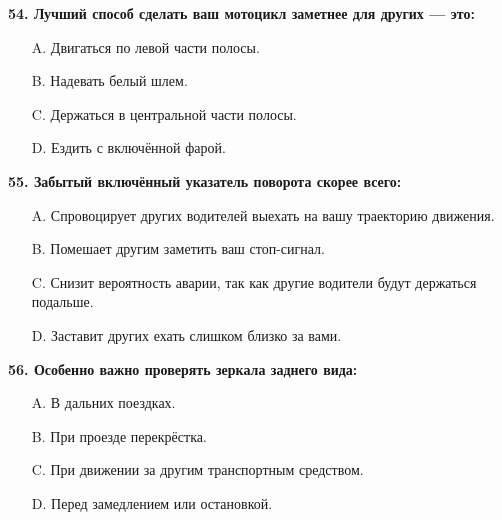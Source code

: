 \begin{minipage}{\linewidth}
\vspace{1em}\noindent\textbf{54. Лучший способ сделать ваш мотоцикл заметнее для других — это:}

\begin{itemize}[nosep,leftmargin=2em]
\item [A.] Двигаться по левой части полосы.
\item [B.] Надевать белый шлем.
\item [C.] Держаться в центральной части полосы.
\item [D.] Ездить с включённой фарой.

\end{itemize}
\end{minipage}


\begin{minipage}{\linewidth}
\vspace{1em}\noindent\textbf{55. Забытый включённый указатель поворота скорее всего:}

\begin{itemize}[nosep,leftmargin=2em]
\item [A.] Спровоцирует других водителей выехать на вашу траекторию движения.
\item [B.] Помешает другим заметить ваш стоп-сигнал.
\item [C.] Снизит вероятность аварии, так как другие водители будут держаться подальше.
\item [D.] Заставит других ехать слишком близко за вами.

\end{itemize}
\end{minipage}


\begin{minipage}{\linewidth}
\vspace{1em}\noindent\textbf{56. Особенно важно проверять зеркала заднего вида:}

\begin{itemize}[nosep,leftmargin=2em]
\item [A.] В дальних поездках.
\item [B.] При проезде перекрёстка.
\item [C.] При движении за другим транспортным средством.
\item [D.] Перед замедлением или остановкой.

\end{itemize}
\end{minipage}


